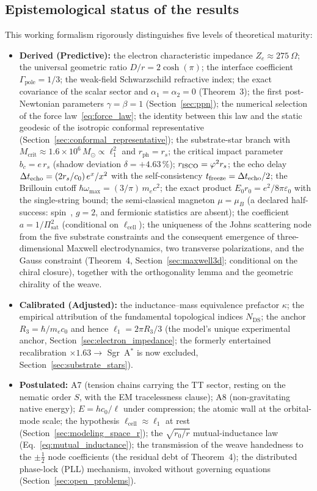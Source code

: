 \documentclass[11pt,a4paper]{article}
\theoremstyle{plain}
\theoremstyle{remark}
\newcommand{\Ncd}{\ensuremath{N_{\mathrm{DS}}}}
\begin{document}
\subsection*{Epistemological status of the results}
This working formalism rigorously distinguishes five levels of theoretical maturity:
\begin{itemize}
    \item \textbf{Derived (Predictive):} the electron characteristic impedance $Z_e \approx 275~\Omega$; the universal geometric ratio $D/r = 2\cosh(\pi)$; the interface coefficient $\Gamma_{\text{pole}} = 1/3$; the weak-field Schwarzschild refractive index; the exact covariance of the scalar sector and $\alpha_1 = \alpha_2 = 0$ (Theorem~3); the first post-Newtonian parameters $\gamma = \beta = 1$ (Section~\ref{sec:ppn}); the numerical selection of the force law~\eqref{eq:force_law}; the identity between this law and the static geodesic of the isotropic conformal representative (Section~\ref{sec:conformal_representative}); the substrate-star branch with $M_{\text{crit}} \approx 1.6\times10^{6}\,M_\odot \propto \ell_1^2$ and $r_{\text{ph}} = r_s$; the critical impact parameter $b_c = e\,r_s$ (shadow deviation $\delta = +4.63\,\%$); $r_{\rm ISCO} = \varphi^2 r_s$; the echo delay $\Delta t_{\rm echo} = (2r_s/c_0)\,e^x/x^2$ with the self-consistency $t_{\rm freeze} = \Delta t_{\rm echo}/2$; the Brillouin cutoff $\hbar\omega_{\max} = (3/\pi)\,m_ec^2$; the exact product $E_0 r_0 = e^2/8\pi\varepsilon_0$ with the single-string bound; the semi-classical magneton $\mu = \mu_B$ (a declared half-success: spin~\textonehalf, $g = 2$, and fermionic statistics are absent); the coefficient $a = 1/\Pi_{\text{sat}}^2$ (conditional on $\ell_{\text{cell}}$); the uniqueness of the Johns scattering node from the five substrate constraints and the consequent emergence of three-dimensional Maxwell electrodynamics, two transverse polarizations, and the Gauss constraint (Theorem~4, Section~\ref{sec:maxwell3d}; conditional on the chiral closure), together with the orthogonality lemma and the geometric chirality of the weave.
    \item \textbf{Calibrated (Adjusted):} the inductance--mass equivalence prefactor $\kappa$; the empirical attribution of the fundamental topological indices $\Ncd$; the anchor $R_3 = \hbar/m_e c_0$ and hence $\ell_1 = 2\pi R_3/3$ (the model's unique experimental anchor, Section~\ref{sec:electron_impedance}; the formerly entertained recalibration $\times1.63 \to$ Sgr~A$^*$ is now excluded, Section~\ref{sec:substrate_stars}).
    \item \textbf{Postulated:} A7 (tension chains carrying the TT sector, resting on the nematic order $S$, with the EM tracelessness clause); A8 (non-gravitating native energy); $E = hc_0/\ell$ under compression; the atomic wall at the orbital-mode scale; the hypothesis $\ell_{\text{cell}} \approx \ell_1$ at rest (Section~\ref{sec:modeling_space_r}); the $\sqrt{r_0/r}$ mutual-inductance law (Eq.~\ref{eq:mutual_inductance}); the transmission of the weave handedness to the $\pm\tfrac12$ node coefficients (the residual debt of Theorem~4); the distributed phase-lock (PLL) mechanism, invoked without governing equations (Section~\ref{sec:open_problems}).

\end{itemize}
\end{document}
